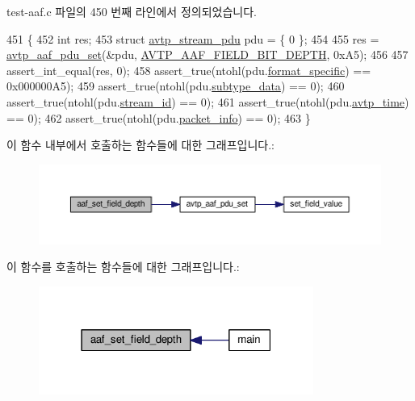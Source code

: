 test-\/aaf.\+c 파일의 450 번째 라인에서 정의되었습니다.


\begin{DoxyCode}
451 \{
452     \textcolor{keywordtype}{int} res;
453     \textcolor{keyword}{struct }\hyperlink{structavtp__stream__pdu}{avtp\_stream\_pdu} pdu = \{ 0 \};
454 
455     res = \hyperlink{avtp__aaf_8h_af242dc7ed6c5ca5ea8e9d5071c13e19d}{avtp\_aaf\_pdu\_set}(&pdu, \hyperlink{avtp__aaf_8h_a7eaee6c1ebc806c0401dbe7b14cd22dbabedcf9db303c9373c61a44389d371993}{AVTP\_AAF\_FIELD\_BIT\_DEPTH}, 0xA5);
456 
457     assert\_int\_equal(res, 0);
458     assert\_true(ntohl(pdu.\hyperlink{structavtp__stream__pdu_acbfc36b550978f88cf0a3d9d2b2ce0dd}{format\_specific}) == 0x000000A5);
459     assert\_true(ntohl(pdu.\hyperlink{structavtp__stream__pdu_a3210e9f18fdc9c29cef7600c4d1e67e9}{subtype\_data}) == 0);
460     assert\_true(ntohl(pdu.\hyperlink{structavtp__stream__pdu_af5af7b461263e29ceb91a8d3a8bc2c97}{stream\_id}) == 0);
461     assert\_true(ntohl(pdu.\hyperlink{structavtp__stream__pdu_a81ec49d93f7a916531f4d97214f47515}{avtp\_time}) == 0);
462     assert\_true(ntohl(pdu.\hyperlink{structavtp__stream__pdu_a737b6c4ff9f6954da39283e7351cbf58}{packet\_info}) == 0);
463 \}
\end{DoxyCode}


이 함수 내부에서 호출하는 함수들에 대한 그래프입니다.\+:
\nopagebreak
\begin{figure}[H]
\begin{center}
\leavevmode
\includegraphics[width=350pt]{test-aaf_8c_a028591d8c830fc2bb65cc9eb3a20f189_cgraph}
\end{center}
\end{figure}




이 함수를 호출하는 함수들에 대한 그래프입니다.\+:
\nopagebreak
\begin{figure}[H]
\begin{center}
\leavevmode
\includegraphics[width=255pt]{test-aaf_8c_a028591d8c830fc2bb65cc9eb3a20f189_icgraph}
\end{center}
\end{figure}


